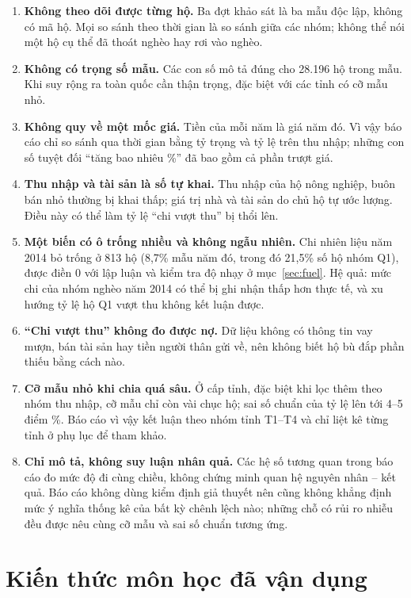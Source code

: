 \documentclass[11pt,a4paper]{article}
\newcommand{\n}[1]{\textbf{#1}}
\begin{document}
\begin{enumerate}[leftmargin=1.5em,itemsep=4pt,topsep=3pt]
\item \n{Không theo dõi được từng hộ.} Ba đợt khảo sát là ba mẫu độc lập, không có mã hộ. Mọi so sánh theo thời gian là so sánh giữa các nhóm; không thể nói một hộ cụ thể đã thoát nghèo hay rơi vào nghèo.
\item \n{Không có trọng số mẫu.} Các con số mô tả đúng cho 28.196 hộ trong mẫu. Khi suy rộng ra toàn quốc cần thận trọng, đặc biệt với các tỉnh có cỡ mẫu nhỏ.
\item \n{Không quy về một mốc giá.} Tiền của mỗi năm là giá năm đó. Vì vậy báo cáo chỉ so sánh qua thời gian bằng tỷ trọng và tỷ lệ trên thu nhập; những con số tuyệt đối “tăng bao nhiêu \%” đã bao gồm cả phần trượt giá.
\item \n{Thu nhập và tài sản là số tự khai.} Thu nhập của hộ nông nghiệp, buôn bán nhỏ thường bị khai thấp; giá trị nhà và tài sản do chủ hộ tự ước lượng. Điều này có thể làm tỷ lệ “chi vượt thu” bị thổi lên.
\item \n{Một biến có ô trống nhiều và không ngẫu nhiên.} Chi nhiên liệu năm 2014 bỏ trống ở 813 hộ (8,7\% mẫu năm đó, trong đó 21,5\% số hộ nhóm Q1), được điền 0 với lập luận và kiểm tra độ nhạy ở mục~\ref{sec:fuel}. Hệ quả: mức chi của nhóm nghèo năm 2014 có thể bị ghi nhận thấp hơn thực tế, và xu hướng tỷ lệ hộ Q1 vượt thu không kết luận được.
\item \n{“Chi vượt thu” không đo được nợ.} Dữ liệu không có thông tin vay mượn, bán tài sản hay tiền người thân gửi về, nên không biết hộ bù đắp phần thiếu bằng cách nào.
\item \n{Cỡ mẫu nhỏ khi chia quá sâu.} Ở cấp tỉnh, đặc biệt khi lọc thêm theo nhóm thu nhập, cỡ mẫu chỉ còn vài chục hộ; sai số chuẩn của tỷ lệ lên tới 4–5 điểm \%. Báo cáo vì vậy kết luận theo nhóm tỉnh T1–T4 và chỉ liệt kê từng tỉnh ở phụ lục để tham khảo.
\item \n{Chỉ mô tả, không suy luận nhân quả.} Các hệ số tương quan trong báo cáo đo mức độ đi cùng chiều, không chứng minh quan hệ nguyên nhân – kết quả. Báo cáo không dùng kiểm định giả thuyết nên cũng không khẳng định mức ý nghĩa thống kê của bất kỳ chênh lệch nào; những chỗ có rủi ro nhiễu đều được nêu cùng cỡ mẫu và sai số chuẩn tương ứng.
\end{enumerate}

\section{Kiến thức môn học đã vận dụng}
\end{document}
